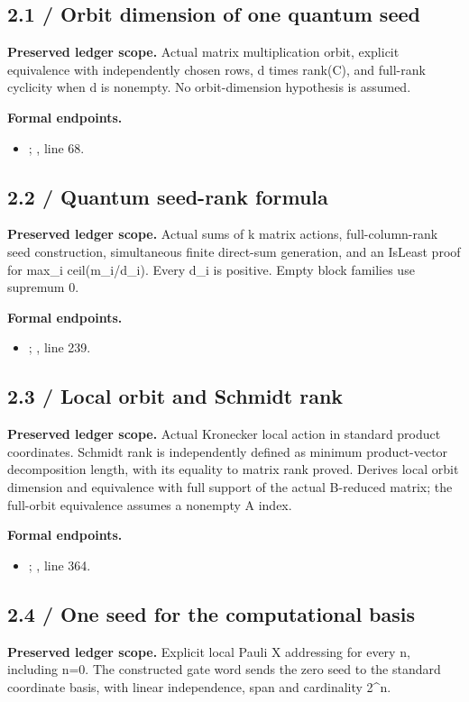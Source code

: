 \subsection{2.1 / Orbit dimension of one quantum seed}
\label{result:2.1}
\textbf{Preserved ledger scope.} Actual matrix multiplication orbit, explicit equivalence with independently chosen rows, d times rank(C), and full-rank cyclicity when d is nonempty. No orbit-dimension hypothesis is assumed.

\textbf{Formal endpoints.}\begin{itemize}
\item {}; , line 68.
\end{itemize}
\subsection{2.2 / Quantum seed-rank formula}
\label{result:2.2}
\textbf{Preserved ledger scope.} Actual sums of k matrix actions, full-column-rank seed construction, simultaneous finite direct-sum generation, and an IsLeast proof for max\_i ceil(m\_i/d\_i). Every d\_i is positive. Empty block families use supremum 0.

\textbf{Formal endpoints.}\begin{itemize}
\item {}; , line 239.
\end{itemize}
\subsection{2.3 / Local orbit and Schmidt rank}
\label{result:2.3}
\textbf{Preserved ledger scope.} Actual Kronecker local action in standard product coordinates. Schmidt rank is independently defined as minimum product-vector decomposition length, with its equality to matrix rank proved. Derives local orbit dimension and equivalence with full support of the actual B-reduced matrix; the full-orbit equivalence assumes a nonempty A index.

\textbf{Formal endpoints.}\begin{itemize}
\item {}; , line 364.
\end{itemize}
\subsection{2.4 / One seed for the computational basis}
\label{result:2.4}
\textbf{Preserved ledger scope.} Explicit local Pauli X addressing for every n, including n=0. The constructed gate word sends the zero seed to the standard coordinate basis, with linear independence, span and cardinality 2\textasciicircum{}n.

